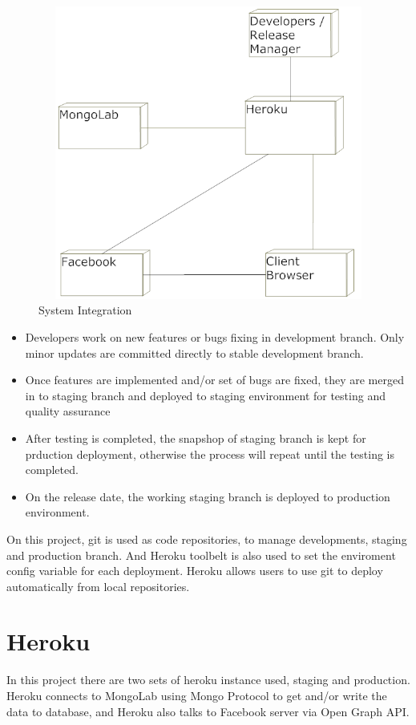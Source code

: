 \vspace{3em}
\begin{figure}[H]
\begin{center}
\includegraphics[height=3.8in,width=6.5in]{images/systemIntegration.png}
\caption{System Integration}
\label{fig:system-integration}
\end{center}
\end{figure}

\begin{itemize}
\item Developers work on new features or bugs fixing in development branch. Only minor updates are committed directly to stable development branch.
\item Once features are implemented and/or set of bugs are fixed, they are merged in to staging branch and deployed to staging environment for testing and quality assurance
\item After testing is completed, the snapshop of staging branch is kept for prduction deployment, otherwise the process will repeat until the testing is completed.
\item On the release date, the working staging branch is deployed to production environment.
\end{itemize}

On this project, git is used as code repositories, to manage developments, staging and production branch. And Heroku toolbelt is also used to set the enviroment config variable for each deployment. Heroku allows users to use git to deploy automatically from local repositories. 
 
\section{Heroku}
In this project there are two sets of heroku instance used, staging and production. 
Heroku connects to MongoLab using Mongo Protocol to get and/or write the data to database, and Heroku also talks to Facebook server via Open Graph API.

